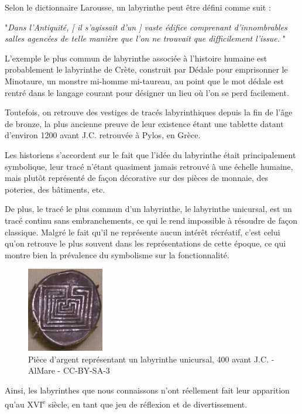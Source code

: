 \documentclass[12pt]{scrreprt} %
\begin{document}
Selon le dictionnaire Larousse, un labyrinthe peut être défini comme suit :

"\textit{Dans l'Antiquité, [ il s'agissait d'un ] vaste édifice comprenant d'innombrables salles agencées de telle manière que l'on ne trouvait que difficilement l'issue.} \cite{LabyrintheLarousse}"

L'exemple le plus commun de labyrinthe associée à l'histoire humaine est probablement le labyrinthe de Crète, construit par Dédale pour emprisonner le Minotaure, un monstre mi-homme mi-taureau, au point que le mot dédale est rentré dans le langage courant pour désigner un lieu où l'on se perd facilement.

Toutefois, on retrouve des vestiges de tracés labyrinthiques depuis la fin de l'âge de bronze, la plus ancienne preuve de leur existence étant une tablette datant d'environ 1200 avant J.C. retrouvée à Pylos, en Grèce.\cite{Kern2000}

Les historiens s'accordent sur le fait que l'idée du labyrinthe était principalement symbolique, leur tracé n'étant quasiment jamais retrouvé à une échelle humaine, mais plutôt représenté de façon décorative sur des pièces de monnaie, des poteries, des bâtiments, etc.

De plus, le tracé le plus commun d'un labyrinthe, le labyrinthe unicursal, est un tracé continu sans embranchements, ce qui le rend impossible à résoudre de façon classique. Malgré le fait qu'il ne représente aucun intérêt récréatif, c'est celui qu'on retrouve le plus souvent dans les représentations de cette époque, ce qui montre bien la prévalence du symbolisme sur la fonctionnalité.

\begin{figure}[h]
    \centering
    \includegraphics[width=0.3\textwidth]{images/pieceknossos.jpeg}
    \caption{Pièce d'argent représentant un labyrinthe unicursal, 400 avant J.C. - AlMare - CC-BY-SA-3}
\end{figure}

Ainsi, les labyrinthes que nous connaissons n'ont réellement fait leur apparition qu'au XVI\textsuperscript{e} siècle\cite{McCullough2004}, en tant que jeu de réflexion et de divertissement.
\end{document}
